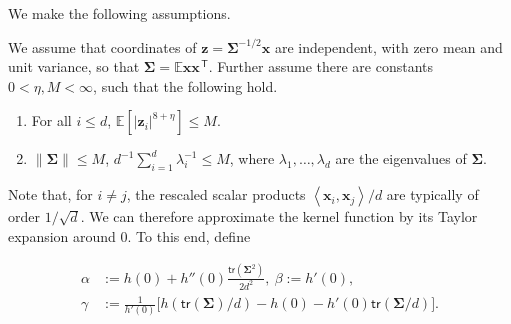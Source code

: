 We make the following assumptions.
\begin{assumption}
	\label{asmpt:kernel_nd_regime}
        We assume that coordinates of ${\boldsymbol z}={\boldsymbol \Sigma}^{-1/2}{\boldsymbol x}$ are independent, with zero mean and unit variance, so that
        ${\boldsymbol \Sigma}=\mathbb{E} {\boldsymbol x}{\boldsymbol x}^\ensuremath{{\scriptscriptstyle\mathsf{\,T}}}$.
        Further assume there are constants
        $0<\eta,M<\infty$, such that the following hold.
        \begin{enumerate}
        \item[$(a)$] For all $i\le d$,
          $\mathbb{E}[|{\boldsymbol z}_i|^{8+\eta}]\le M$.
        \item[$(b)$] $\|{\boldsymbol \Sigma}\| \le M$, $d^{-1}\sum_{i=1}^d\lambda_i^{-1}\le M$, where $\lambda_1,\dots,\lambda_d$ are the eigenvalues of ${\boldsymbol \Sigma}$.
        \end{enumerate}
\end{assumption}

Note that, for $i\neq j$, the rescaled scalar products $\left\langle {\boldsymbol x}_i,{\boldsymbol x}_j \right\rangle/d$ are typically of order $1/\sqrt{d}$.  We can therefore approximate the kernel function by its Taylor expansion around $0$. To this end, define

\begin{align*}
  \alpha &:= h(0)+ h''(0)\frac{\mathsf{tr}({\boldsymbol \Sigma}^2)}{2d^2},~ \beta := h'(0),\\
  \gamma &:= \frac{1}{h'(0)}\big[h(\mathsf{tr}({\boldsymbol \Sigma})/d) - h(0)-h'(0)\mathsf{tr}({\boldsymbol \Sigma}/d)\big].
\end{align*}

